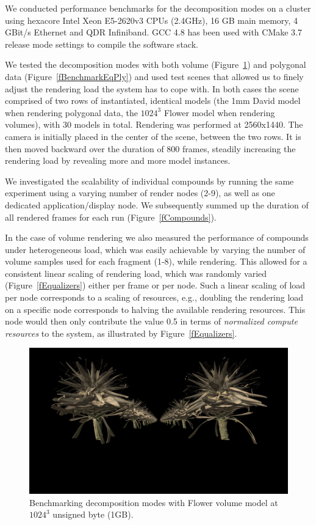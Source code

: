\documentclass[10pt,journal,compsoc]{IEEEtran}
\newcommand{\fig}[1]{Figure~\ref{#1}}
\begin{document}
We conducted performance benchmarks for the decomposition modes on a cluster using hexacore Intel Xeon E5-2620v3 CPUs (2.4GHz), 16 GB main memory, 4 GBit/s Ethernet and QDR Infiniband. GCC 4.8 has been used with CMake 3.7 release mode settings to compile the software stack.

We tested the decomposition modes with both volume (\fig{fBenchmarkEVolve}) and polygonal data  (\fig{fBenchmarkEqPly}) and used test scenes that allowed us to finely adjust the rendering load the system has to cope with. In both cases the scene comprised of two rows of instantiated, identical models (the 1mm David model when rendering polygonal data, the $1024^3$ Flower model when rendering volumes), with 30 models in total. Rendering was performed
at 2560x1440. The camera is initially placed in the center of the scene, between the two rows. It is then moved backward over the duration of 800 frames, steadily increasing the rendering load by revealing more and more model instances.

We investigated the scalability of individual compounds by running the same experiment using a varying number of render nodes (2-9), as well as one dedicated application/display node. We subsequently summed up the duration of all rendered frames for each run (\fig{fCompounds}).

In the case of volume rendering we also measured the performance of compounds under heterogeneous load, which was easily achievable by varying the number of volume samples used for each fragment (1-8), while rendering. This allowed for a consistent linear scaling of rendering load, which was randomly varied (\fig{fEqualizers}) either per frame or per node. Such a linear scaling of load per node corresponds to a scaling of resources, e.g., doubling the rendering load on a specific node corresponds to halving the available rendering resources. This node would then only contribute the value 0.5 in terms of {\em normalized compute resources} to the system, as illustrated by \fig{fEqualizers}.

\begin{figure}[ht]\center
  \includegraphics[width=.9\columnwidth]{images/benchmark_eVolve}
  \caption{\label{fBenchmarkEVolve} Benchmarking decomposition modes with Flower volume model at $1024^3$ unsigned byte (1GB).}
\end{figure}
\end{document}
